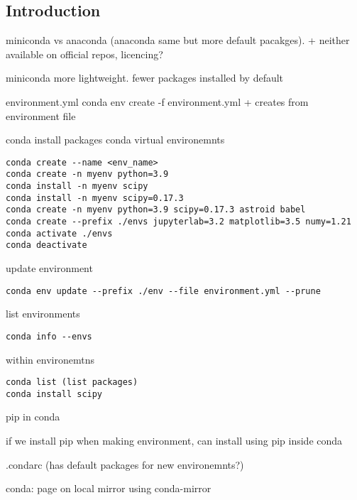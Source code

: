 
\subsection{Introduction}



miniconda vs anaconda (anaconda same but more default pacakges). 
+ neither available on official repos, licencing?

miniconda more lightweight. fewer packages installed by default

environment.yml
conda env create -f environment.yml
+ creates from environment file

conda install packages
conda virtual environemnts

\begin{verbatim}
conda create --name <env_name>
conda create -n myenv python=3.9
conda install -n myenv scipy
conda install -n myenv scipy=0.17.3
conda create -n myenv python=3.9 scipy=0.17.3 astroid babel
conda create --prefix ./envs jupyterlab=3.2 matplotlib=3.5 numy=1.21
conda activate ./envs
conda deactivate
\end{verbatim}


update environment
\begin{verbatim}
conda env update --prefix ./env --file environment.yml --prune
\end{verbatim}

list environments
\begin{verbatim}
conda info --envs
\end{verbatim}

within environemtns
\begin{verbatim}
conda list (list packages)
conda install scipy
\end{verbatim}

pip in conda

if we install pip when making environment, can install using pip inside conda

.condarc (has default packages for new environemnts?)

conda: page on local mirror using conda-mirror

